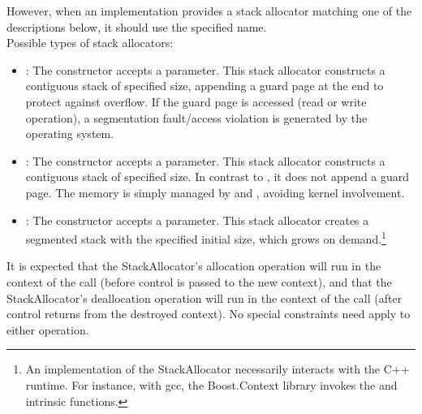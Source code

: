 However, when an implementation provides a stack allocator matching one of
the descriptions below, it should use the specified name.\\

Possible types of stack allocators:
\begin{itemize}
    \item {}: The constructor accepts a 
        parameter. This stack allocator constructs a contiguous stack of
        specified size, appending a guard page at the end to protect against
        overflow. If the guard page is accessed (read or write operation), a
        segmentation fault/access violation is generated by the operating
        system.
    \item {}: The constructor accepts a  parameter.
        This stack allocator constructs a contiguous stack of specified size.
        In contrast to , it does not append a guard
        page. The memory is simply managed by 
        and , avoiding kernel involvement.
    \item {}: The constructor accepts a  parameter.
        This stack allocator creates a segmented stack\cite{gccsplit} with the
        specified initial size, which grows on demand.\footnote{An
        implementation of the  StackAllocator necessarily
        interacts with the C++ runtime. For instance, with gcc, the
        Boost.Context\cite{bcontext} library invokes
        the 
        and  intrinsic
        functions.\cite{splitalloc}\citecomma\cite{bctxseg}}
\end{itemize}

It is expected that the StackAllocator's allocation operation will run in the
context of the \callcc call (before control is passed to the new context), and
that the StackAllocator's deallocation operation will run in the context of
the \dtor call (after control returns from the destroyed
context). No special constraints need apply to either operation.
